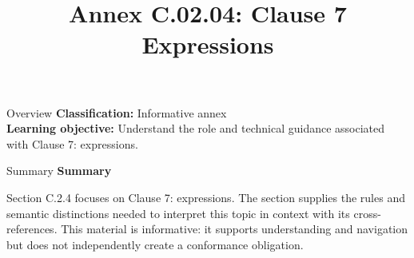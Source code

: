 \documentclass[10pt,letterpaper]{article}
\title{Annex C.02.04: Clause 7 Expressions}
\author{}
\date{}
\begin{document}
\maketitle
\begin{CornellOverviewBox}{Overview}
\textbf{Classification:} Informative annex\\[2pt]
\textbf{Learning objective:} Understand the role and technical guidance associated with Clause 7: expressions.
\end{CornellOverviewBox}\begin{CornellSummaryBox}{Summary}
{\sffamily\bfseries\color{Accent} Summary}\par\vspace{3pt}Section C.2.4 focuses on Clause 7: expressions. The section supplies the rules and semantic distinctions needed to interpret this topic in context with its cross-references. This material is informative: it supports understanding and navigation but does not independently create a conformance obligation.
\end{CornellSummaryBox}
\end{document}
